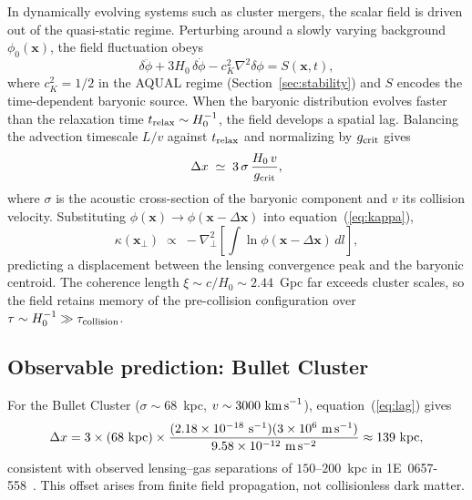 \documentclass[11pt,a4paper]{article}
\begin{document}
In dynamically evolving systems such as cluster mergers, the scalar field is driven
out of the quasi-static regime. Perturbing around a slowly varying background
$\phi_0(\mathbf{x})$, the field fluctuation obeys
\begin{equation}
  \delta\ddot{\phi} + 3H_0\,\delta\dot{\phi} - c_K^2\nabla^2\delta\phi
  = S(\mathbf{x},t),
\end{equation}
where $c_K^2 = 1/2$ in the AQUAL regime (Section~\ref{sec:stability}) and $S$
encodes the time-dependent baryonic source. When the baryonic distribution evolves
faster than the relaxation time $t_{\rm relax}\sim H_0^{-1}$, the field
develops a spatial lag. Balancing the advection timescale $L/v$ against
$t_{\rm relax}$ and normalizing by $g_{\rm crit}$ gives
\begin{equation}
  \Delta x \;\simeq\; 3\,\sigma\,\frac{H_0\,v}{g_{\rm crit}},
  \label{eq:lag}
\end{equation}
where $\sigma$ is the acoustic cross-section of the baryonic component and $v$
its collision velocity. Substituting $\phi(\mathbf{x})\to\phi(\mathbf{x}-\Delta\mathbf{x})$
into equation~(\ref{eq:kappa}),
\begin{equation}
  \boxed{\kappa(\mathbf{x}_\perp) \;\propto\;
  -\nabla_\perp^2\!\left[\int\ln\phi(\mathbf{x}-\Delta\mathbf{x})\,dl\right],}
  \label{eq:kappa_lag}
\end{equation}
predicting a displacement between the lensing convergence peak and the baryonic
centroid. The coherence length $\xi\sim c/H_0\sim2.44$~Gpc far exceeds cluster
scales, so the field retains memory of the pre-collision configuration over
$\tau\sim H_0^{-1}\gg\tau_{\rm collision}$.

\subsection{Observable prediction: Bullet Cluster}
\label{subsec:bullet}

For the Bullet Cluster ($\sigma\sim68$~kpc, $v\sim3000\ \text{km\,s}^{-1}$),
equation~(\ref{eq:lag}) gives
\begin{equation}
  \Delta x
  = 3\times(68\ \text{kpc})\times
  \frac{(2.18\times10^{-18}\ \text{s}^{-1})(3\times10^6\ \text{m\,s}^{-1})}
       {9.58\times10^{-12}\ \text{m\,s}^{-2}}
  \approx 139\ \text{kpc},
\end{equation}
consistent with observed lensing--gas separations of $150$--$200$~kpc in
1E~0657-558~\cite{Clowe2006}. This offset arises from finite field propagation,
not collisionless dark matter.
\end{document}
